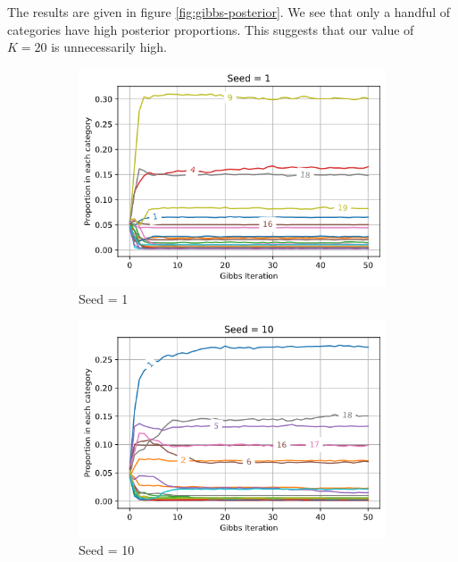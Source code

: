 \documentclass[]{article}
\begin{document}
The results are given in figure \ref{fig:gibbs-posterior}. We see that only a handful of categories have high posterior proportions. This suggests that our value of $K=20$ is unnecessarily high. 
%
\begin{figure}[!h]
	\begin{subfigure}{0.33\linewidth}
		\centering
		\includegraphics[width=\linewidth]{gibbs-posterior-1.png}
		\caption{Seed = 1}	
	\end{subfigure}
	\begin{subfigure}{0.33\linewidth}
		\centering
		\includegraphics[width=\linewidth]{gibbs-posterior-2.png}
		\caption{Seed =	10}
	\end{subfigure}
	\begin{subfigure}{0.33\linewidth}
		\centering

\end{subfigure}
\end{figure}
\end{document}
